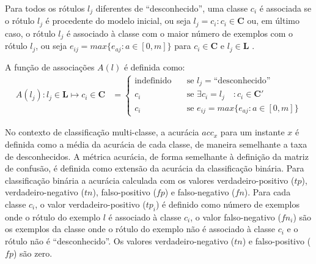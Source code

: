 Para todos os rótulos $l_j$ diferentes de ``desconhecido'', uma classe $c_i$ é
associada se o rótulo $l_j$ é procedente do modelo inicial, ou seja $l_j = c_i :
c_i \in \mathbf{C}$ ou, em último caso, o rótulo $l_j$ é associado à classe com
o maior número de exemplos com o rótulo $l_j$, ou seja $e_{ij} = max\{ e_{aj} :
a \in [0, m] \}$ para $c_i \in \mathbf{C}$ e $l_j \in \mathbf{L}$
\cite{Faria2013evaluation}.

\begin{definition}
  A função de associações $A(l)$ é definida como:
  \begin{align}
    A(l_j) : l_j \in \mathbf{L} \mapsto c_i \in \mathbf{C} &= \begin{cases} 
      \text{indefinido}        & \quad \text{se } l_j = \text{``desconhecido''} \\
      c_i         & \quad \text{se } \exists c_i = l_j \quad: c_i \in \mathbf{C}' \\
      c_i         & \quad \text{se } e_{ij} = max\{ e_{aj} : a \in [0, m] \}
    \end{cases}
  \end{align}
\end{definition}

No contexto de classificação multi-classe, a acurácia $\mathit{acc}_x$ para um
instante $x$ é definida como a média da acurácia de cada classe, de maneira
semelhante a taxa de desconhecidos.
A métrica acurácia, de forma semelhante à definição da matriz de confusão,
é definida como extensão da acurácia da classificação binária.
Para classificação binária a acurácia calculada com os valores
verdadeiro-positivo ($tp$), verdadeiro-negativo ($tn$), falso-positivo ($fp$) e
falso-negativo ($fn$).
Para cada classe $c_i$, o valor verdadeiro-positivo ($tp_i$) é definido como
número de exemplos onde o rótulo do exemplo $l$ é associado à
classe $c_i$, o valor falso-negativo ($fn_i$) são os exemplos da classe onde o
rótulo do exemplo não é associado à classe $c_i$ e o rótulo não é ``desconhecido''.
Os valores verdadeiro-negativo ($tn$) e falso-positivo ($fp$) são zero.


